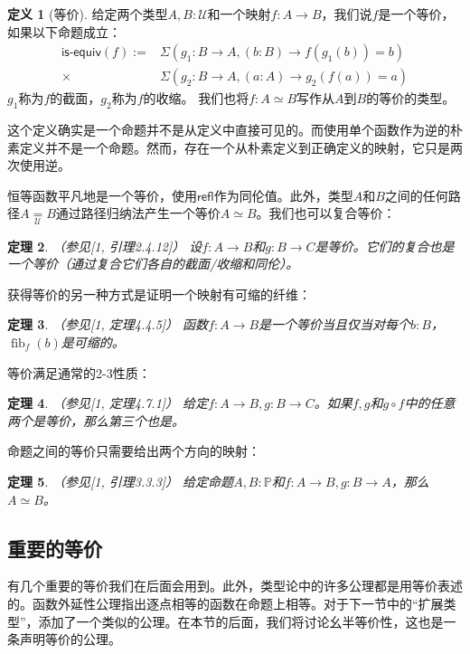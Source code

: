 \documentclass{ctexrep}
\theoremstyle{plain}
\newtheorem{theorem}{定理}[section]
\theoremstyle{definition}
\newtheorem{definition}[theorem]{定义}
\theoremstyle{remark}
\theoremstyle{definition}
\theoremstyle{definition}
\theoremstyle{definition}
\newcommand{\coloneqq}{\mathrel{:=}}
\newcommand{\fib}{\operatorname{fib}}
\newcommand{\refl}{\mathsf{refl}}
\newcommand{\isequiv}{\mathsf{is\text{-}equiv}}
\newcommand{\UU}{\mathcal{U}}
\begin{document}
\begin{definition}[等价]
给定两个类型$A,B:\UU$和一个映射$f:A\to B$，我们说$f$是一个等价，如果以下命题成立：
\begin{align*}
\isequiv(f) \coloneqq &\Sigma(g_1:B\to A,(b:B)\to f(g_1(b))=b) \\
\times &\Sigma(g_2:B\to A,(a:A)\to g_2(f(a))=a)
\end{align*}
$g_1$称为$f$的截面，$g_2$称为$f$的收缩。
我们也将$f:A\simeq B$写作从$A$到$B$的等价的类型。
\end{definition}

这个定义确实是一个命题并不是从定义中直接可见的。而使用单个函数作为逆的朴素定义并不是一个命题。然而，存在一个从朴素定义到正确定义的映射，它只是两次使用逆。

恒等函数平凡地是一个等价，使用$\refl$作为同伦值。此外，类型$A$和$B$之间的任何路径$A\underset{\UU}{=}B$通过路径归纳法产生一个等价$A\simeq B$。我们也可以复合等价：

\begin{theorem}（参见[1, 引理2.4.12]）
设$f:A\to B$和$g:B\to C$是等价。它们的复合也是一个等价（通过复合它们各自的截面/收缩和同伦）。
\end{theorem}

获得等价的另一种方式是证明一个映射有可缩的纤维：

\begin{theorem}（参见[1, 定理4.4.5]）
函数$f:A\to B$是一个等价当且仅当对每个$b:B$，$\fib_f(b)$是可缩的。
\end{theorem}

等价满足通常的2-3性质：

\begin{theorem}（参见[1, 定理4.7.1]）
给定$f:A\to B,g:B\to C$。如果$f,g$和$g\circ f$中的任意两个是等价，那么第三个也是。
\end{theorem}

命题之间的等价只需要给出两个方向的映射：

\begin{theorem}（参见[1, 引理3.3.3]）
给定命题$A,B:\mathbb{P}$和$f:A\to B,g:B\to A$，那么$A\simeq B$。
\end{theorem}

\subsection{重要的等价}

有几个重要的等价我们在后面会用到。此外，类型论中的许多公理都是用等价表述的。函数外延性公理指出逐点相等的函数在命题上相等。对于下一节中的“扩展类型”，添加了一个类似的公理。在本节的后面，我们将讨论幺半等价性，这也是一条声明等价的公理。
\end{document}
